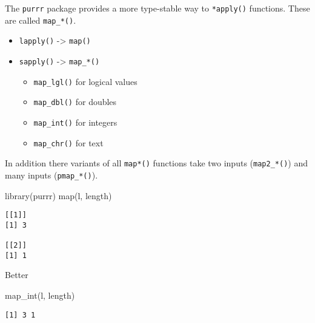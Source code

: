 \documentclass[ignorenonframetext,,t]{beamer}
\providecommand{\tightlist}{%
\setlength{\itemsep}{0pt}\setlength{\parskip}{0pt}}
\newenvironment{Shaded}{\begin{snugshade}}{\end{snugshade}}
\newcommand{\FunctionTok}[1]{\textcolor[rgb]{0.00,0.00,0.00}{#1}}
\newcommand{\NormalTok}[1]{#1}
\providecommand{\tightlist}{%
\setlength{\itemsep}{0pt}\setlength{\parskip}{0pt}}
\renewcommand{\tightlist}{\setlength{\itemsep}{1.4ex}\setlength{\parskip}{0pt}}
\begin{document}
\begin{frame}[fragile]
The \texttt{purrr} package provides a more type-stable way to
\texttt{*apply()} functions. These are called \texttt{map\_*()}.

\begin{itemize}
\tightlist
\item
  \texttt{lapply()} -\textgreater{} \texttt{map()}
\item
  \texttt{sapply()} -\textgreater{} \texttt{map\_*()}

  \begin{itemize}
  \tightlist
  \item
    \texttt{map\_lgl()} for logical values
  \item
    \texttt{map\_dbl()} for doubles
  \item
    \texttt{map\_int()} for integers
  \item
    \texttt{map\_chr()} for text
  \end{itemize}
\end{itemize}

In addition there variants of all \texttt{map*()} functions take two
inputs (\texttt{map2\_*()}) and many inputs (\texttt{pmap\_*()}).
\end{frame}

\begin{frame}[fragile]
\begin{Shaded}
\begin{Highlighting}[]
\FunctionTok{library}\NormalTok{(purrr)}
\FunctionTok{map}\NormalTok{(l, length)}
\end{Highlighting}
\end{Shaded}

\begin{verbatim}
[[1]]
[1] 3

[[2]]
[1] 1
\end{verbatim}

Better

\begin{Shaded}
\begin{Highlighting}[]
\FunctionTok{map\_int}\NormalTok{(l, length)}
\end{Highlighting}
\end{Shaded}

\begin{verbatim}
[1] 3 1
\end{verbatim}
\end{frame}
\end{document}
